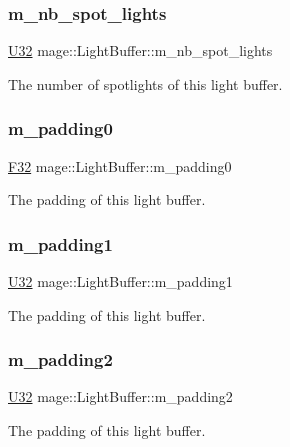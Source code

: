 \subsubsection{\texorpdfstring{m\+\_\+nb\+\_\+spot\+\_\+lights}{m\_nb\_spot\_lights}}
{\footnotesize\ttfamily \hyperlink{namespacemage_a41c104c036fba3756a74e19f793eeaa1}{U32} mage\+::\+Light\+Buffer\+::m\+\_\+nb\+\_\+spot\+\_\+lights}

The number of spotlights of this light buffer. \hypertarget{structmage_1_1_light_buffer_a119f009dc4bdc39c32ea7d3c439b72f8}{}\label{structmage_1_1_light_buffer_a119f009dc4bdc39c32ea7d3c439b72f8} 
\subsubsection{\texorpdfstring{m\+\_\+padding0}{m\_padding0}}
{\footnotesize\ttfamily \hyperlink{namespacemage_aa97e833b45f06d60a0a9c4fc22ae02c0}{F32} mage\+::\+Light\+Buffer\+::m\+\_\+padding0}

The padding of this light buffer. \hypertarget{structmage_1_1_light_buffer_ac300e3454170680db1e290537fbf4a11}{}\label{structmage_1_1_light_buffer_ac300e3454170680db1e290537fbf4a11} 
\subsubsection{\texorpdfstring{m\+\_\+padding1}{m\_padding1}}
{\footnotesize\ttfamily \hyperlink{namespacemage_a41c104c036fba3756a74e19f793eeaa1}{U32} mage\+::\+Light\+Buffer\+::m\+\_\+padding1}

The padding of this light buffer. \hypertarget{structmage_1_1_light_buffer_acb9ba3e74a2d5f3344f573d9236496ef}{}\label{structmage_1_1_light_buffer_acb9ba3e74a2d5f3344f573d9236496ef} 
\subsubsection{\texorpdfstring{m\+\_\+padding2}{m\_padding2}}
{\footnotesize\ttfamily \hyperlink{namespacemage_a41c104c036fba3756a74e19f793eeaa1}{U32} mage\+::\+Light\+Buffer\+::m\+\_\+padding2}

The padding of this light buffer. 